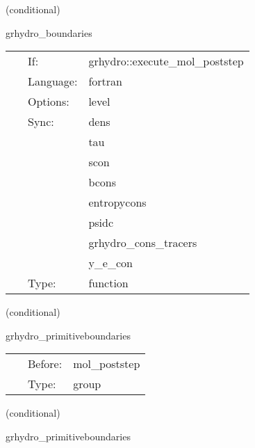 \documentclass{article}
\begin{document}
\vspace{5mm}

   (conditional) 

\hspace{5mm} grhydro\_boundaries 

\hspace{5mm}{\it select grhydro boundary conditions } 


\hspace{5mm}

 \begin{tabular*}{160mm}{cll} 
~ & If:  & grhydro::execute\_mol\_poststep \\ 
~ & Language:  & fortran \\ 
~ & Options:  & level \\ 
~ & Sync:  & dens \\ 
~& ~ &tau\\ 
~& ~ &scon\\ 
~& ~ &bcons\\ 
~& ~ &entropycons\\ 
~& ~ &psidc\\ 
~& ~ &grhydro\_cons\_tracers\\ 
~& ~ &y\_e\_con\\ 
~ & Type:  & function \\ 
\end{tabular*} 


\vspace{5mm}

   (conditional) 

\hspace{5mm} grhydro\_primitiveboundaries 

\hspace{5mm}{\it apply boundary conditions to all primitives } 


\hspace{5mm}

 \begin{tabular*}{160mm}{cll} 
~ & Before:  & mol\_poststep \\ 
~ & Type:  & group \\ 
\end{tabular*} 


\vspace{5mm}

   (conditional) 

\hspace{5mm} grhydro\_primitiveboundaries 
\end{document}
